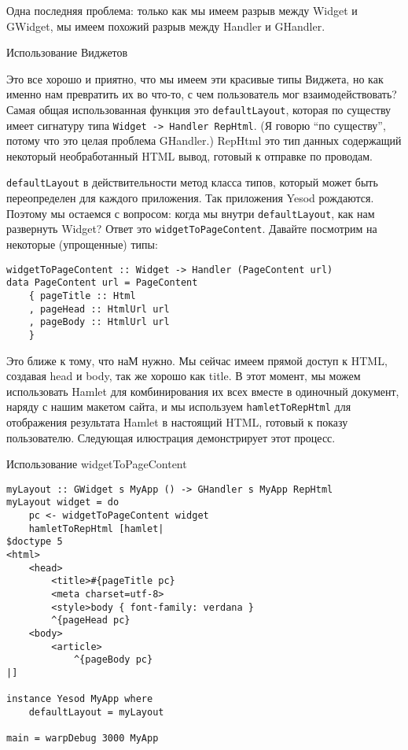 Одна последняя проблема: только как мы имеем разрыв между Widget и GWidget, мы имеем похожий разрыв между Handler и GHandler.

Использование Виджетов

Это все хорошо и приятно, что мы имеем эти красивые типы Виджета, но как именно нам превратить их во что-то, с чем пользователь мог взаимодействовать? Самая общая использованная функция это \lstinline'defaultLayout', которая по существу имеет сигнатуру типа \lstinline'Widget -> Handler RepHtml'. (Я говорю \textquotedblleft по существу\textquotedblright, потому что это целая проблема GHandler.) RepHtml это тип данных содержащий некоторый необработанный HTML вывод, готовый к отправке по проводам.

\lstinline'defaultLayout' в действительности метод класса типов, который может быть переопределен для каждого приложения. Так приложения Yesod рождаются. Поэтому мы остаемся с вопросом: когда мы внутри \lstinline'defaultLayout', как нам развернуть Widget? Ответ это \lstinline'widgetToPageContent'. Давайте посмотрим на некоторые (упрощенные) типы: 

\begin{lstlisting}
widgetToPageContent :: Widget -> Handler (PageContent url)
data PageContent url = PageContent
    { pageTitle :: Html
    , pageHead :: HtmlUrl url
    , pageBody :: HtmlUrl url
    }
\end{lstlisting} 

Это ближе к тому, что наМ нужно. Мы сейчас имеем прямой доступ к HTML, создавая head и body, так же хорошо как title. В этот момент, мы можем использовать Hamlet для комбинирования их всех вместе в одиночный документ, наряду с нашим макетом сайта, и мы используем \lstinline'hamletToRepHtml' для отображения результата Hamlet в настоящий HTML, готовый к показу пользователю. Следующая илюстрация демонстрирует этот процесс.

Использование widgetToPageContent

\begin{lstlisting}
myLayout :: GWidget s MyApp () -> GHandler s MyApp RepHtml
myLayout widget = do
    pc <- widgetToPageContent widget
    hamletToRepHtml [hamlet|
$doctype 5
<html>
    <head>
        <title>#{pageTitle pc}
        <meta charset=utf-8>
        <style>body { font-family: verdana }
        ^{pageHead pc}
    <body>
        <article>
            ^{pageBody pc}
|]

instance Yesod MyApp where
    defaultLayout = myLayout

main = warpDebug 3000 MyApp
\end{lstlisting}

